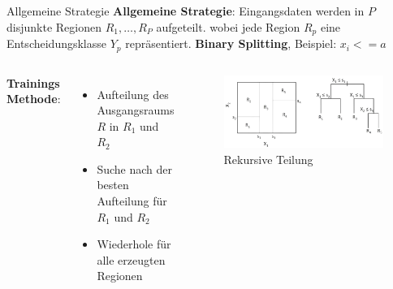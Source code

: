 \documentclass{beamer}
\begin{document}
\begin{frame}{Allgemeine Strategie}
	\textbf{Allgemeine Strategie}: Eingangsdaten werden in $P$ disjunkte Regionen $R_1,\dots,R_P$ aufgeteilt. 
	wobei jede Region $R_p$ eine Entscheidungsklasse $Y_p$ repräsentiert. 
 \textbf{Binary Splitting}, Beispiel: $x_i <= a$ \vspace{0.25cm}
	
	\begin{columns}
				\textbf{Trainings Methode}:
				\begin{itemize}
					\item {Aufteilung des Ausgangsraums $R$ in $R_1$ und $R_2$}
					\item{Suche nach der besten Aufteilung für $R_1$ und $R_2$}
					\item{Wiederhole für alle erzeugten Regionen}
				\end{itemize}
			
			\begin{figure}
				\includegraphics[width=\linewidth]{Images/split.png}
				\caption{Rekursive Teilung \cite{hastie_tibshirani_friedman}}
			\end{figure}
	\end{columns}
\end{frame}
\end{document}
